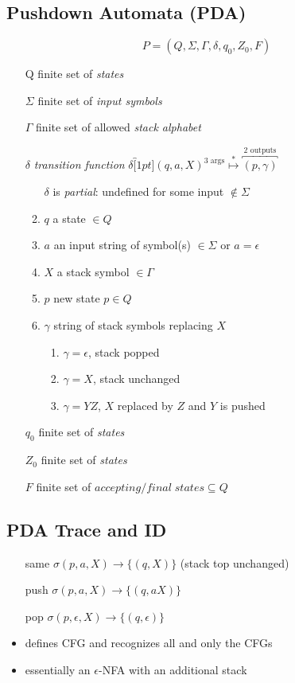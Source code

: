 \documentclass[10pt,a4paper,landscape]{article}
\begin{document}
\begin{multicols*}{3}
\section*{Pushdown Automata (PDA)}
\vspace{0.5em}
\[ P = (Q,\Sigma,\Gamma,\delta,q_{0},Z_{0},F) \]
\begin{itemize}
\item[Q] finite set of \emph{states}
\item[\(\Sigma\)] finite set of \emph{input symbols}
\item[\(\Gamma\)] finite set of allowed \emph{stack alphabet}
\item[\(\delta\)] \emph{transition function}
    \(
\delta\overbracket[1pt]{(q,a,X)}^\text{3 args} \overset{*}{\mapsto} \overbracket{(p,\gamma)}^\text{2 outputs}
  \)
  \begin{enumerate}[leftmargin=1em,labelindent=2em]
  \item[$\delta$] is \emph{partial}: undefined for some input \(\notin \Sigma\)
  \item $q$ a state \(\in Q\)
  \item $a$ an input string of symbol(s) \(\in \Sigma\) or \(a = \epsilon\)
  \item $X$ a stack symbol \(\in \Gamma \)
  \item $p$ new state \(p \in Q\)
  \item $\gamma$ string of stack symbols replacing $X$
    \begin{enumerate}
      \item $\gamma = \epsilon$, stack popped
      \item $\gamma = X$, stack unchanged
      \item $\gamma = YZ$, $X$ replaced by $Z$ and $Y$ is pushed
    \end{enumerate}
  \end{enumerate}
\item[$q_{0}$] finite set of \emph{states}
\item[$Z_{0}$] finite set of \emph{states}
\item[$F$] finite set of \(accepting/final\; states \subseteq Q\)
\end{itemize}
\subsection*{PDA Trace and ID}
\begin{enumerate}[leftmargin=2.5em,labelindent=2em]
\item [same] \(\sigma(p,a,X) \rightarrow \{(q,X)\}\) (stack top unchanged)
\item [push] \(\sigma(p,a,X) \rightarrow \{(q,aX)\}\)
\item [pop]  \(\sigma(p,\epsilon,X) \rightarrow \{(q,\epsilon)\}\)
\end{enumerate}
\begin{itemize}
\item defines CFG and recognizes all and only the CFGs
\item essentially an \(\epsilon\)-NFA with an additional stack
\end{itemize}

\end{multicols*}
\end{document}
